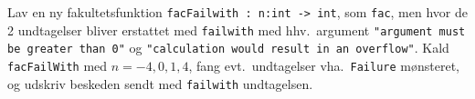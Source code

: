 Lav en ny fakultetsfunktion \lstinline{facFailwith : n:int -> int}, som \lstinline{fac}, men hvor de 2 undtagelser bliver erstattet med \lstinline{failwith} med hhv.\ argument \lstinline{"argument must be greater than 0"} og \lstinline{"calculation would result in an overflow"}. Kald \lstinline{facFailWith} med $n=-4,0,1,4$, fang evt.\ undtagelser vha.\ \lstinline{Failure} mønsteret, og udskriv beskeden sendt med \lstinline{failwith} undtagelsen.